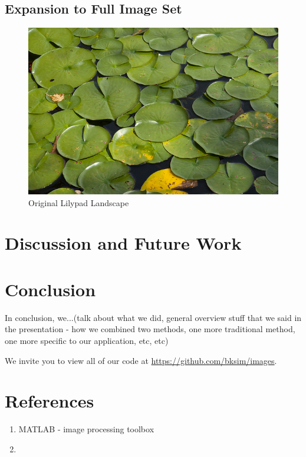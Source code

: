 \documentclass[12pt]{article}
\theoremstyle{plain}%
\theoremstyle{definition}
\theoremstyle{remark}
\begin{document}
\subsection{Expansion to Full Image Set}

\begin{figure}[!h]
	\centering
		\includegraphics{lilypad.jpg}
	\caption{Original Lilypad Landscape}
\end{figure}

\section{Discussion and Future Work}

\section{Conclusion}
In conclusion, we...(talk about what we did, general overview stuff that we said in the presentation - how we combined two methods, one more traditional method, one more specific to our application, etc, etc)

We invite you to view all of our code at \url{https://github.com/bksim/images}.
\section{References}
\begin{enumerate}
\item MATLAB - image processing toolbox
\item 

\end{enumerate}
	
\end{document}

